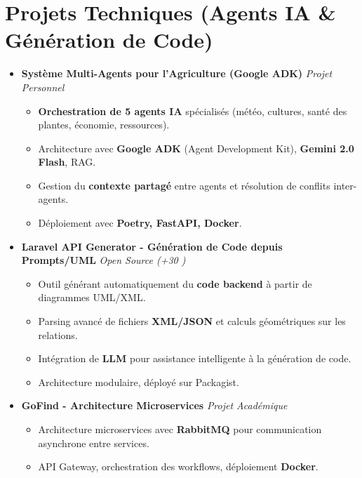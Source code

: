 \documentclass[a4paper,11pt]{article}
\begin{document}
\section{Projets Techniques (Agents IA \& Génération de Code)}
\begin{itemize}[leftmargin=*, label={}]

\item \textbf{Système Multi-Agents pour l'Agriculture (Google ADK)} \hfill \textit{Projet Personnel}
\vspace{-2pt}
    \begin{itemize}[leftmargin=0.4cm, nosep, label=\tiny$\bullet$]
        \item \small{\textbf{Orchestration de 5 agents IA} spécialisés (météo, cultures, santé des plantes, économie, ressources).}
        \item \small{Architecture avec \textbf{Google ADK} (Agent Development Kit), \textbf{Gemini 2.0 Flash}, RAG.}
        \item \small{Gestion du \textbf{contexte partagé} entre agents et résolution de conflits inter-agents.}
        \item \small{Déploiement avec \textbf{Poetry, FastAPI, Docker}.}
    \end{itemize}
    \vspace{3pt}

\item \textbf{Laravel API Generator - Génération de Code depuis Prompts/UML} \hfill \textit{Open Source (+30 \faGithubAlt)}
\vspace{-2pt}
    \begin{itemize}[leftmargin=0.4cm, nosep, label=\tiny$\bullet$]
        \item \small{Outil générant automatiquement du \textbf{code backend} à partir de diagrammes UML/XML.}
        \item \small{Parsing avancé de fichiers \textbf{XML/JSON} et calculs géométriques sur les relations.}
        \item \small{Intégration de \textbf{LLM} pour assistance intelligente à la génération de code.}
        \item \small{Architecture modulaire, déployé sur Packagist.}
    \end{itemize}
    \vspace{3pt}

\item \textbf{GoFind - Architecture Microservices} \hfill \textit{Projet Académique}
\vspace{-2pt}
    \begin{itemize}[leftmargin=0.4cm, nosep, label=\tiny$\bullet$]
        \item \small{Architecture microservices avec \textbf{RabbitMQ} pour communication asynchrone entre services.}
        \item \small{API Gateway, orchestration des workflows, déploiement \textbf{Docker}.}
    \end{itemize}
    \vspace{3pt}


\end{itemize}
\end{document}
